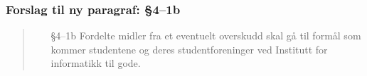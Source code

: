 \documentclass[10pt,norsk,a4paper]{article}
\begin{document}
\subsubsection{Forslag til ny paragraf: §4--1b}
\begin{quote}
	\begin{enumerate}
		\item[§4--1b] Fordelte midler fra et eventuelt overskudd skal gå til formål som kommer studentene og deres studentforeninger ved Institutt for informatikk til gode.
	\end{enumerate}
\end{quote}\label{lastpage}

\newpage


\end{document}
